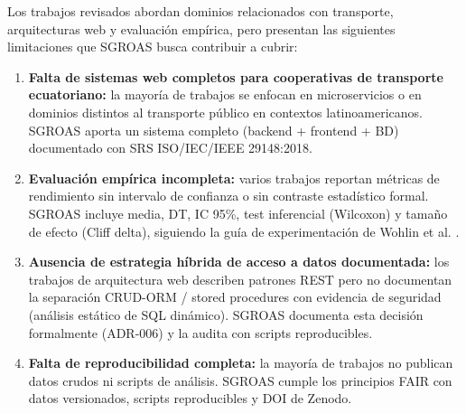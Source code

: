 Los trabajos revisados abordan dominios relacionados con transporte, arquitecturas web y evaluación empírica, pero presentan las siguientes limitaciones que SGROAS busca contribuir a cubrir:

\begin{enumerate}
  \item \textbf{Falta de sistemas web completos para cooperativas de transporte ecuatoriano:} la mayoría de trabajos se enfocan en microservicios \cite{alshuqayran2016,soldani2018,taibi2018,waseem2021} o en dominios distintos al transporte público en contextos latinoamericanos. SGROAS aporta un sistema completo (backend + frontend + BD) documentado con SRS ISO/IEC/IEEE 29148:2018.

  \item \textbf{Evaluación empírica incompleta:} varios trabajos reportan métricas de rendimiento sin intervalo de confianza \cite{jiang2009} o sin contraste estadístico formal. SGROAS incluye media, DT, IC 95\%, test inferencial (Wilcoxon) y tamaño de efecto (Cliff delta), siguiendo la guía de experimentación de Wohlin et al. \cite{wohlin2012}.

  \item \textbf{Ausencia de estrategia híbrida de acceso a datos documentada:} los trabajos de arquitectura web \cite{pautasso2008,fielding2002} describen patrones REST pero no documentan la separación CRUD-ORM / stored procedures con evidencia de seguridad (análisis estático de SQL dinámico). SGROAS documenta esta decisión formalmente (ADR-006) y la audita con scripts reproducibles.

  \item \textbf{Falta de reproducibilidad completa:} la mayoría de trabajos no publican datos crudos ni scripts de análisis. SGROAS cumple los principios FAIR \cite{wilkinson2016} con datos versionados, scripts reproducibles y DOI de Zenodo.
\end{enumerate}
